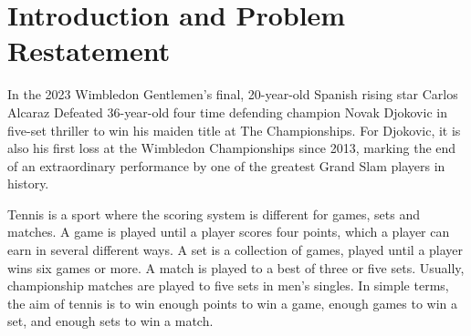 \documentclass{mcmthesis}
\begin{document}
\section{Introduction and Problem Restatement}

%

%
In the 2023 Wimbledon Gentlemen’s final, 20-year-old Spanish rising star Carlos Alcaraz Defeated 36-year-old four time defending champion Novak Djokovic in five-set thriller to win his maiden title at The Championships. For Djokovic, it is also his first loss at the Wimbledon Championships since 2013, marking the end of an extraordinary performance by one of the greatest Grand Slam players in history.

Tennis is a sport where the scoring system is different for games, sets and matches. A game is played until a player scores four points, which a player can earn in several different ways. A set is a collection of games, played until a player wins six games or more. A match is played to a best of three or five sets. Usually, championship matches are played to five sets in men's singles. In simple terms, the aim of tennis is to win enough points to win a game, enough games to win a set, and enough sets to win a match. 
\end{document}
